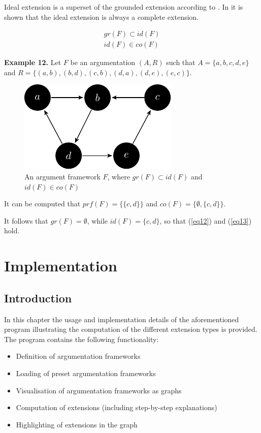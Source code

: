 \documentclass[draft,final]{vutinfth} %
\newcommand{\hl}{\par\vspace{6pt}} %
\newcommand{\cl}{\par\vspace{12pt}} %
\begin{document}
Ideal extension is a superset of the grounded extension according to \cite{Dung2}. In \cite{Baroni} it is shown that the ideal extension is always a complete extension.

\begin{align}
	\label{eq12} gr(F)\subset id(F)\\
	\label{eq13} id(F)\in co(F)
\end{align}\hl

\textbf{Example 12.} Let $F$ be an argumentation $(A,R)$ such that $A=\{a,b,c,d,e\}$ and $R=\{(a,b),(b,d),(c,b),(d,a),(d,e),(e,c)\}$.\hl

\FloatBarrier
	\begin{figure}[!h]
		\centering
		\includegraphics[scale=1.5]{graphs/ex6.pdf}
		\caption{An argument framework $F$, where $gr(F)\subset id(F)$ and $id(F)\in co(F)$}
	\end{figure}
\FloatBarrier

It can be computed that $prf(F)=\{\{c,d\}\}$ and $co(F)=\{\emptyset,\{c,d\}\}$.\hl
It follows that $gr(F)=\emptyset$, while $id(F)=\{c,d\}$, so that (\ref{eq12}) and (\ref{eq13}) hold.\cl

\chapter{Implementation}

\section{Introduction}
In this chapter the usage and implementation details of the aforementioned program illustrating the computation of the different extension types is provided. The program contains the following functionality:\hl

\begin{itemize}
\item Definition of argumentation frameworks
\item Loading of preset argumentation frameworks
\item Visualisation of argumentation frameworks as graphs
\item Computation of extensions (including step-by-step explanations)
\item Highlighting of extensions in the graph
\end{itemize}
\end{document}
